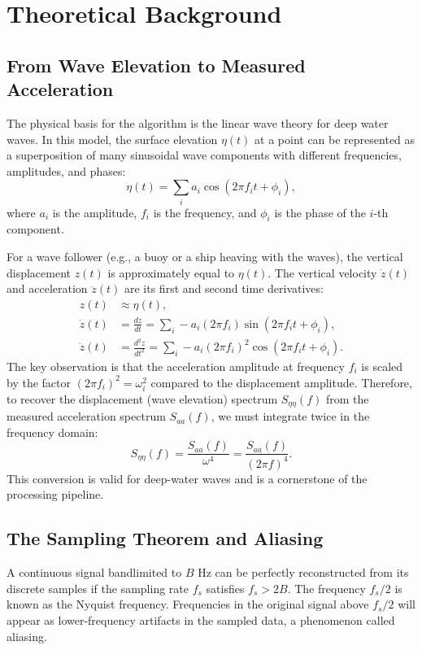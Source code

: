 \documentclass[11pt,letterpaper]{article}
\begin{document}
    \section{Theoretical Background}
    \label{sec:theory}

    \subsection{From Wave Elevation to Measured Acceleration}
    The physical basis for the algorithm is the linear wave theory for deep water waves. In this model, the surface elevation $\eta(t)$ at a point can be represented as a superposition of many sinusoidal wave components with different frequencies, amplitudes, and phases:
    \begin{equation}
        \eta(t) = \sum_{i} a_i \cos(2\pi f_i t + \phi_i),
    \end{equation}
    where $a_i$ is the amplitude, $f_i$ is the frequency, and $\phi_i$ is the phase of the $i$-th component.

    For a wave follower (e.g., a buoy or a ship heaving with the waves), the vertical displacement $z(t)$ is approximately equal to $\eta(t)$. The vertical velocity $\dot{z}(t)$ and acceleration $\ddot{z}(t)$ are its first and second time derivatives:
    \begin{align}
        z(t) &\approx \eta(t), \\
        \dot{z}(t) &= \frac{dz}{dt} = \sum_{i} -a_i (2\pi f_i) \sin(2\pi f_i t + \phi_i), \\
        \ddot{z}(t) &= \frac{d^2z}{dt^2} = \sum_{i} -a_i (2\pi f_i)^2 \cos(2\pi f_i t + \phi_i).
    \end{align}
    The key observation is that the acceleration amplitude at frequency $f_i$ is scaled by the factor $(2\pi f_i)^2 = \omega_i^2$ compared to the displacement amplitude. Therefore, to recover the displacement (wave elevation) spectrum $S_{\eta\eta}(f)$ from the measured acceleration spectrum $S_{aa}(f)$, we must integrate twice in the frequency domain:
    \begin{equation}
        \label{eq:acc2disp}
        S_{\eta\eta}(f) = \frac{S_{aa}(f)}{\omega^4} = \frac{S_{aa}(f)}{(2\pi f)^4}.
    \end{equation}
    This conversion is valid for deep-water waves and is a cornerstone of the processing pipeline.

    \subsection{The Sampling Theorem and Aliasing}
    \label{subsec:nyquist}
    \begin{keyconcept}
        A continuous signal bandlimited to $B$ Hz can be perfectly reconstructed from its discrete samples if the sampling rate $f_s$ satisfies $f_s > 2B$. The frequency $f_s/2$ is known as the Nyquist frequency. Frequencies in the original signal above $f_s/2$ will appear as lower-frequency artifacts in the sampled data, a phenomenon called aliasing.
    \end{keyconcept}
\end{document}
